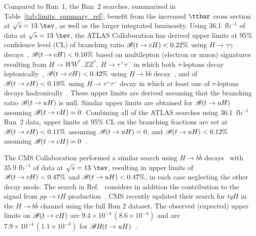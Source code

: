 Compared to Run~1, the Run~2 searches, summarised in Table~\ref{tab:limits_summary_ref}, benefit from the increased $\ttbar$ cross section at $\sqrt{s}=13~\tev$, as well as the larger integrated luminosity.
Using 36.1~fb$^{-1}$ of data at $\sqrt{s}=13~\tev$, the ATLAS Collaboration has derived upper limits at 95\% confidence level (CL) of branching ratio
$\mathscr{B}(t\to cH)<0.22\%$ using $H\to \gamma\gamma$ decays~\cite{Aaboud:2017mfd}, $\mathscr{B}(t\to cH)<0.16\%$ based on
multilepton (electron or muon) signatures resulting from 
$H \to  WW^*, ZZ^*$, $H\to \tau^+\tau^-$ in which both $\tau$-leptons decay leptonically~\cite{Aaboud:2018pob},
$\mathscr{B}(t\to cH)<0.42\%$ using $H\to b\bar{b}$ decay~\cite{fcnc36}, and of $\mathscr{B}(t\to cH)<0.19\%$ using $H\to \tau^+\tau^-$ decay in which at least
one of $\tau$-leptons decays hadronically~\cite{fcnc36}.  
These upper limits are derived assuming that the branching ratio $\mathscr{B}(t\to uH)$ is null. Similar upper limits are obtained for $\mathscr{B}(t\to uH)$ assuming $\mathscr{B}(t\to cH)=0$.
Combining all of the ATLAS searches using 36.1~fb$^{-1}$ Run~2 data, upper limits at 95\% CL on the branching fractions are 
set at $\mathscr{B}(t\to cH)<0.11\%$ assuming $\mathscr{B}(t\to uH)=0$, and $\mathscr{B}(t\to uH)<0.12\%$ assuming $\mathscr{B}(t\to cH)=0$~\cite{fcnc36}.

The CMS Collaboration performed a similar search using  
$H\to b\bar{b}$ decays~\cite{Sirunyan:2017uae} with 35.9 fb$^{-1}$ of data at $\sqrt{s}=13~\tev$, resulting 
in upper limits of $\mathscr{B}(t\to cH)<0.47\%$ and $\mathscr{B}(t\to uH)<0.47\%$, in each case neglecting the other decay mode.
The search in Ref.~\cite{Sirunyan:2017uae} considers in addition the contribution to the signal from 
$pp \to tH$ production~\cite{Greljo:2014dka}. 
CMS recently updated their search for $tqH$ in the $H\to b\bar{b}$ channel using
the full Run 2 dataset. The observed (expected) upper limits on  $\mathscr{B}(t\to cH)$ are $9.4\times10^{-4}\, (8.6\times10^{-4})$
and are $7.9\times10^{-4}\, (1.1\times10^{-3})$ for $\mathscr{B}{B}(t\to uH)$~\cite{CMS:2021gfa}.


